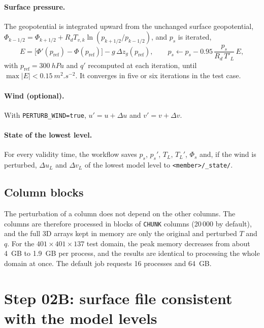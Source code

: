 \documentclass[11pt,a4paper]{article}
\newcommand{\code}[1]{\texttt{#1}}
\begin{document}
\paragraph{Surface pressure.}
The geopotential is integrated upward from the unchanged surface
geopotential, $\Phi_{k-1/2} = \Phi_{k+1/2} + R_d T_{v,k}
\ln(p_{k+1/2}/p_{k-1/2})$, and $p_s$ is iterated,
\begin{equation}
  E = \bigl[\Phi'(p_{\mathrm{ref}}) - \Phi(p_{\mathrm{ref}})\bigr] - g\,\Delta z_g(p_{\mathrm{ref}}),\qquad
  p_s \leftarrow p_s - 0.95\, \frac{p_s}{R_d\, T'_L}\, E,
\end{equation}
with $p_{\mathrm{ref}} = \SI{300}{hPa}$ and $q'$ recomputed at each
iteration, until $\max|E| < \SI{0.15}{m^2.s^{-2}}$. It converges in five or
six iterations in the test case.

\paragraph{Wind (optional).}
With \code{PERTURB\_WIND=true}, $u' = u + \Delta u$ and $v' = v + \Delta v$.

\paragraph{State of the lowest level.}
For every validity time, the workflow saves $p_s$, $p_s'$, $T_L$, $T_L'$,
$\Phi_s$ and, if the wind is perturbed, $\Delta u_L$ and $\Delta v_L$ of the
lowest model level to \code{<member>/\_state/}.

\subsection{Column blocks}
\label{sec:blocks}

The perturbation of a column does not depend on the other columns. The
columns are therefore processed in blocks of \code{CHUNK} columns (20\,000
by default), and the full 3D arrays kept in memory are only the original and
perturbed $T$ and $q$. For the $401\times401\times137$ test domain, the peak
memory decreases from about \SI{4}{GB} to \SI{1.9}{GB} per process, and the
results are identical to processing the whole domain at once. The default job
requests 16 processes and \SI{64}{GB}.

\section{Step 02B: surface file consistent with the model levels}
\label{sec:surface}
\end{document}
